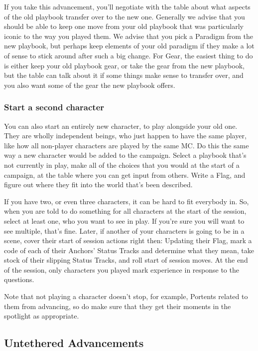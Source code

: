 \documentclass[
  oneside,
  statementpaper,
  9pt]{memoir}
\begin{document}
If you take this advancement, you'll negotiate with the table about what
aspects of the old playbook transfer over to the new one. Generally we
advise that you should be able to keep one move from your old playbook
that was particularly iconic to the way you played them. We advise that
you pick a Paradigm from the new playbook, but perhaps keep elements of
your old paradigm if they make a lot of sense to stick around after such
a big change. For Gear, the easiest thing to do is either keep your old
playbook gear, or take the gear from the new playbook, but the table can
talk about it if some things make sense to transfer over, and you also
want some of the gear the new playbook offers.

\hypertarget{start-a-second-character}{%
\subsubsection{Start a second
character}\label{start-a-second-character}}

You can also start an entirely new character, to play alongside your old
one. They are wholly independent beings, who just happen to have the
same player, like how all non-player characters are played by the same
MC. Do this the same way a new character would be added to the campaign.
Select a playbook that's not currently in play, make all of the choices
that you would at the start of a campaign, at the table where you can
get input from others. Write a Flag, and figure out where they fit into
the world that's been described.

If you have two, or even three characters, it can be hard to fit
everybody in. So, when you are told to do something for all characters
at the start of the session, select at least one, who you want to see in
play. If you're sure you will want to see multiple, that's fine. Later,
if another of your characters is going to be in a scene, cover their
start of session actions right then: Updating their Flag, mark a code of
each of their Anchors' Status Tracks and determine what they mean, take
stock of their slipping Status Tracks, and roll start of session moves.
At the end of the session, only characters you played mark experience in
response to the questions.

Note that not playing a character doesn't stop, for example, Portents
related to them from advancing, so do make sure that they get their
moments in the spotlight as appropriate.

\hypertarget{untethered-advancements-1}{%
\subsection{Untethered Advancements}\label{untethered-advancements-1}}
\end{document}
